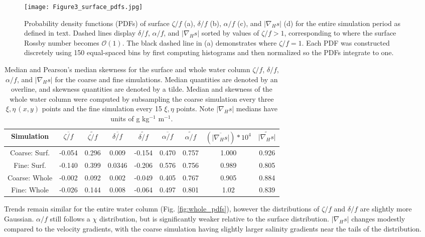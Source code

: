 \documentclass[draft]{agujournal2019}
\begin{document}
\begin{figure}[ht] 
 \centerline{\texttt{[image: Figure3\_surface\_pdfs.jpg]}}
  \caption{Probability density functions (PDFs) of surface $\zeta/f$ (a), $\delta/f$ (b), $\alpha/f$ (c), and $|\nabla_H s|$ (d) for the entire simulation period as defined in text. Dashed lines display $\delta/f$, $\alpha/f$, and $|\nabla_H s|$ sorted by values of $\zeta/f>1$, corresponding to where the surface Rossby number becomes $\mathcal{O}(1)$. The black dashed line in (a) demonstrates where $\zeta/f=1$. Each PDF was constructed discretely using 150 equal-spaced bins by first computing histograms and then normalized so the PDFs integrate to one.}
  \label{fig:surface_pdfs}
\end{figure}

 \begin{table}
    \caption{Median and Pearson's median skewness for the surface and whole water column $\zeta/f$, $\delta/f$, $\alpha/f$, and $|\nabla_H s|$ for the coarse and fine simulations. Median quantities are denoted by an overline, and skewness quantities are denoted by a tilde. Median and skewness of the whole water column were computed by subsampling the coarse simulation every three $\xi, \eta \, (x,y)$ points and the fine simulation every 15 $\xi, \eta$ points. Note $|\nabla_H s|$ medians have units of g kg$^{-1}$ m$^{-1}$.}
    \centering
        \begin{tabular}{c c c c c c c c c}
        \hline
         Simulation & $\overline{\zeta/f}$ & $\widetilde{\zeta/f}$  & $\overline{\delta/f}$ &
         $\widetilde{\delta/f}$ &
         $\overline{\alpha/f}$  &
         $\widetilde{\alpha/f}$ & 
         $(\overline{|\nabla_H s|})*10^4$  &
         $\widetilde{|\nabla_H s|}$ \\
        \hline
         Coarse: Surf. & -0.054 & 0.296 & 0.009 & -0.154 & 0.470 & 0.757 & 1.000 & 0.926 \\
         Fine: Surf. & -0.140 & 0.399 & 0.0346 & -0.206 & 0.576 & 0.756 & 0.989 & 0.805 \\
         Coarse: Whole & -0.002 & 0.092 & 0.002 & -0.049 & 0.405 & 0.767 & 0.905 & 0.884 \\
         Fine: Whole &  -0.026 & 0.144 & 0.008 & -0.064 & 0.497 & 0.801 & 1.02 & 0.839 \\
        \hline
         \end{tabular} 
         \label{tab:1}
 \end{table}
 
Trends remain similar for the entire water column (Fig. \ref{fig:whole_pdfs}), however the distributions of $\zeta/f$ and $\delta/f$ are slightly more Gaussian. $\alpha/f$ still follows a $\chi$ distribution, but is significantly weaker relative to the surface distribution.  $|\nabla_H s|$ changes modestly compared to the velocity gradients, with the coarse simulation having slightly larger salinity gradients near the tails of the distribution. 
\end{document}
